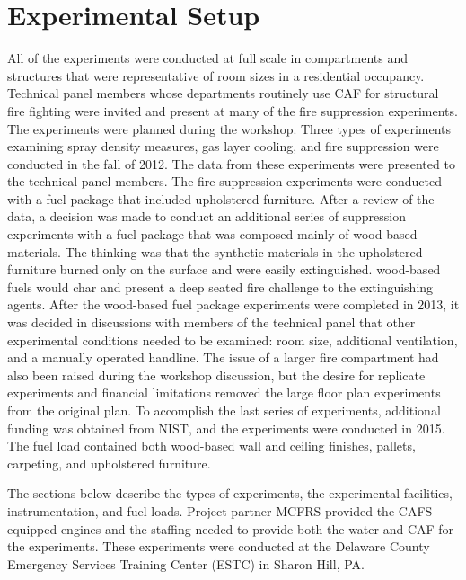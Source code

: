 \documentclass[12pt,oneside]{book}
\begin{document}
\chapter{Experimental Setup}

All of the experiments were conducted at full scale in compartments and structures that were representative of room sizes in a residential occupancy. Technical panel members whose departments routinely use CAF for structural fire fighting were invited and present at many of the fire suppression experiments. The experiments were planned during the workshop.  Three types of experiments examining spray density measures, gas layer cooling, and fire suppression were conducted in the fall of 2012. The data from these experiments were presented to the technical panel members. The fire suppression experiments were conducted with a fuel package that included upholstered furniture. After a review of the data, a decision was made to conduct an additional series of suppression experiments with a fuel package that was composed mainly of wood-based materials. The thinking was that the synthetic materials in the upholstered furniture burned only on the surface and were easily extinguished. wood-based fuels would char and present a deep seated fire challenge to the extinguishing agents.  After the wood-based fuel package experiments were completed in 2013, it was decided in discussions with members of the technical panel that other experimental conditions needed to be examined: room size, additional ventilation, and a manually operated handline. The issue of a larger fire compartment had also been raised during the workshop discussion, but the desire for replicate experiments and financial limitations removed the large floor plan experiments from the original plan. To accomplish the last series of experiments, additional funding was obtained from NIST, and the experiments were conducted in 2015. The fuel load contained both wood-based wall and ceiling finishes, pallets, carpeting, and upholstered furniture.  

The sections below describe the types of experiments, the experimental facilities, instrumentation, and fuel loads. Project partner MCFRS provided the CAFS equipped engines and the staffing needed to provide both the water and CAF for the experiments. These experiments were conducted at the Delaware County Emergency Services Training Center (ESTC) in Sharon Hill, PA.
\end{document}
